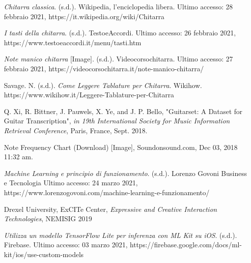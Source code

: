 \documentclass[12pt,a4paper]{book}
\begin{document}
    
    \begin{thebibliography}{100}  %
    
     \textit{Chitarra classica}. (s.d.). Wikipedia, l'enciclopedia libera. Ultimo accesso: 28 febbraio 2021, https://it.wikipedia.org/wiki/Chitarra
    
     \textit{I tasti della chitarra}. (s.d.). TestoeAccordi. Ultimo accesso: 26 febbraio 2021, https://www.testoeaccordi.it/menu/tasti.htm
    
     \textit{Note manico chitarra} [Image]. (s.d.). Videocorsochitarra. Ultimo accesso: 27 febbraio 2021, https://videocorsochitarra.it/note-manico-chitarra/
    
     Savage. N. (s.d.). \textit{Come Leggere Tablature per Chitarra}. Wikihow. https://www.wikihow.it/Leggere-Tablature-per-Chitarra
    	
     Q. Xi, R. Bittner, J. Pauwels, X. Ye, and J. P. Bello, "Guitarset: A Dataset for Guitar Transcription", \emph{in 19th International Society for Music Information Retrieval Conference}, Paris, France, Sept. 2018.
    
     Note Frequency Chart (Download) [Image], Soundonsound.com, Dec 03, 2018 11:32 am.
    
      \textit{Machine Learning e principio di funzionamento}. (s.d.). Lorenzo Govoni Business e Tecnologia Ultimo accesso: 24 marzo 2021, https://www.lorenzogovoni.com/machine-learning-e-funzionamento/
    
     Drexel University, ExCITe Center, \emph{Expressive and Creative Interaction Technologies}, NEMISIG 2019
    
     \textit{Utilizza un modello TensorFlow Lite per inferenza con ML Kit su iOS}. (s.d.). Firebase. Ultimo accesso: 03 marzo 2021, https://firebase.google.com/docs/ml-kit/ios/use-custom-models

	\end{thebibliography}
\end{document}
